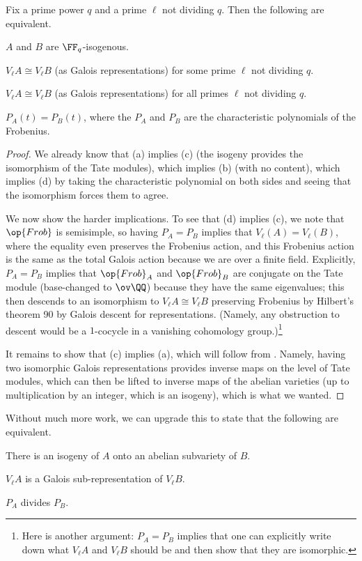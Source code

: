 \documentclass[../notes.tex]{subfiles}
\begin{document}
\begin{corollary}
	Fix a prime power $q$ and a prime $\ell$ not dividing $q$. Then the following are equivalent.
	\begin{listalph}
		\item $A$ and $B$ are $\FF_q$-isogenous.
		\item $V_\ell A\cong V_\ell B$ (as Galois representations) for some prime $\ell$ not dividing $q$.
		\item $V_\ell A\cong V_\ell B$ (as Galois representations) for all primes $\ell$ not dividing $q$.
		\item $P_A(t)=P_B(t)$, where the $P_A$ and $P_B$ are the characteristic polynomials of the Frobenius.
	\end{listalph}
\end{corollary}
\begin{proof}
	We already know that (a) implies (c) (the isogeny provides the isomorphism of the Tate modules), which implies (b) (with no content), which implies (d) by taking the characteristic polynomial on both sides and seeing that the isomorphism forces them to agree.

	We now show the harder implications. To see that (d) implies (c), we note that $\op{Frob}$ is semisimple, so having $P_A=P_B$ implies that $V_\ell(A)=V_\ell(B)$, where the equality even preserves the Frobenius action, and this Frobenius action is the same as the total Galois action because we are over a finite field. Explicitly, $P_A=P_B$ implies that $\op{Frob}_A$ and $\op{Frob}_B$ are conjugate on the Tate module (base-changed to $\ov\QQ$) because they have the same eigenvalues; this then descends to an isomorphism to $V_\ell A\cong V_\ell B$ preserving Frobenius by Hilbert's theorem 90 by Galois descent for representations. (Namely, any obstruction to descent would be a $1$-cocycle in a vanishing cohomology group.)\footnote{Here is another argument: $P_A=P_B$ implies that one can explicitly write down what $V_\ell A$ and $V_\ell B$ should be and then show that they are isomorphic.}

	It remains to show that (c) implies (a), which will follow from . Namely, having two isomorphic Galois representations provides inverse maps on the level of Tate modules, which can then be lifted to inverse maps of the abelian varieties (up to multiplication by an integer, which is an isogeny), which is what we wanted.
\end{proof}
\begin{remark}
	Without much more work, we can upgrade this to state that the following are equivalent.
	\begin{listalph}
		\item There is an isogeny of $A$ onto an abelian subvariety of $B$.
		\item $V_\ell A$ is a Galois sub-representation of $V_\ell B$.
		\item $P_A$ divides $P_B$.
	\end{listalph}
\end{remark}
\end{document}

